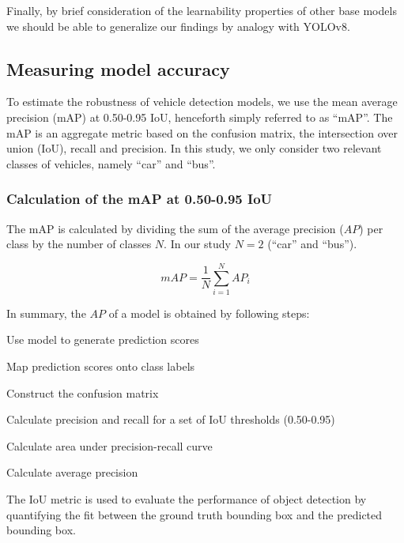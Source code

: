\documentclass[]{article}
\begin{document}
	Finally, by brief consideration of the learnability properties of other base models we should be able to generalize our findings by analogy with YOLO{\small v8}.	

\subsection{Measuring model accuracy}

	To estimate the robustness of vehicle detection models, we use the mean average precision (mAP) at 0.50-0.95 IoU, henceforth simply referred to as ``mAP''. The mAP is an aggregate metric based on the confusion matrix, the intersection over union (IoU), recall and precision. In this study, we only consider two relevant classes of vehicles, namely ``car'' and ``bus''.

\subsubsection{Calculation of the mAP at 0.50-0.95 IoU}

	The mAP is calculated by dividing the sum of the average precision ($AP$) per class by the number of classes $N$.  In our study $N = 2$ (``car'' and ``bus'').
	
	\[
	mAP = \frac{1}{N} \sum_{i=1}^{N} AP_i
	\]

	In summary, the $AP$ of a model is obtained by following steps:

	\begin{center}
		\begin{compactenum}
			\item Use model to generate prediction scores
			\item Map prediction scores onto class labels
			\item Construct the confusion matrix
			\item Calculate precision and recall for a set of IoU thresholds (0.50-0.95)
			\item Calculate area under precision-recall curve
			\item Calculate average precision
		\end{compactenum}
	\end{center}

	The IoU metric is used to evaluate the performance of object detection by quantifying the fit between the ground truth bounding box and the predicted bounding box.
	
\end{document}
